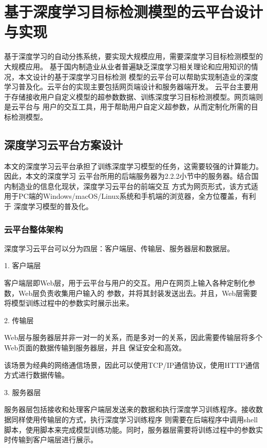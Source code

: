 \chapter{基于深度学习目标检测模型的云平台设计与实现}

基于深度学习的自动分拣系统，要实现大规模应用，需要深度学习目标检测模型的大规模应用。
基于国内制造业从业者普遍缺乏深度学习相关理论和应用知识的情况，本文设计的基于深度学习目标检测
模型的云平台可以帮助实现制造业的深度学习普及化。云平台的实现主要包括网页端设计和服务器端开发。
云平台主要用于存储接收用户自定义模型的超参数数据、训练深度学习目标检测模型。网页端则是云平台与
用户的交互工具，用于帮助用户自定义超参数，从而定制化所需的目标检测模型。

\section{深度学习云平台方案设计}

本文的深度学习云平台承担了训练深度学习模型的任务，这需要较强的计算能力。因此，本文的深度学习
云平台所用的后端服务器为2.2.2小节中的服务器。结合国内制造业的信息化现状，深度学习云平台的前端交互
方式为网页形式，该方式适用于PC端的Windows/macOS/Linux系统和手机端的浏览器，全方位覆盖，有利于
深度学习模型的普及化。

\subsection{云平台整体架构}

深度学习云平台可以分为四层：客户端层、传输层、服务器层和数据层。

1. 客户端层

客户端层即Web层，用于云平台与用户的交互。用户在网页上输入各种定制化参数，Web层负责收集用户输入的
参数，并将其封装发送出去。并且，Web层需要将模型训练过程中的参数实时展示出来。

2. 传输层

Web层与服务器层并非一对一的关系，而是多对一的关系，因此需要传输层将多个Web页面的数据传输到服务器层，并且
保证安全和高效。

该场景为经典的网络通信场景，因此可以使用TCP/IP通信协议，使用HTTP通信方式进行数据传输。

3. 服务器层

服务器层包括接收和处理客户端层发送来的数据和执行深度学习训练程序。接收数据同样使用传输层的方式，执行深度学习训练程序
则需要在后端程序中调用shell脚本，使用脚本来完成模型训练功能。同时，服务器层需要将训练过程中的参数实时传输到客户端层进行展示。

